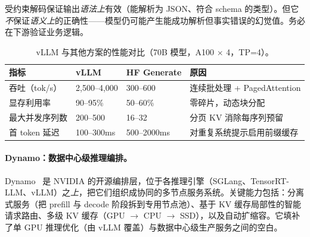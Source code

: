 \begin{warningbox}[结构化输出 $\neq$ 正确输出]
受约束解码保证输出\emph{语法上}有效（能解析为 JSON、符合 schema 的类型）。但它\emph{不}保证\emph{语义上}的正确性——模型仍可能产生能成功解析但事实错误的幻觉值。务必在下游验证业务逻辑。
\end{warningbox}

\begin{table}[ht!]
\centering\small
\caption{vLLM 与其他方案的性能对比（70B 模型，A100 $\times$ 4，TP=4）。}
\noindent\begin{tabularx}{\linewidth}{@{}l Z{0.61} Z{0.6} Z{1.79}@{}}
\toprule
\textbf{指标} & \textbf{vLLM} & \textbf{HF Generate} & \textbf{原因} \\
\midrule
吞吐（tok/s） & 2,500--4,000 & 300--600 & 连续批处理 + PagedAttention \\
显存利用率 & 90--95\% & 50--60\% & 零碎片，动态块分配 \\
最大并发序列数 & 200--500 & 16--32 & 分页 KV 消除每序列预留 \\
首 token 延迟 & 100--300ms & 500--2000ms & 对重复系统提示启用前缀缓存 \\
\bottomrule
\end{tabularx}
\end{table}

\paragraph{Dynamo：数据中心级推理编排。}
Dynamo~\cite{dynamo2025nvidia} 是 NVIDIA 的开源编排层，位于各推理引擎（SGLang、TensorRT-LLM、vLLM）之\emph{上}，把它们组织成协同的多节点服务系统。关键能力包括：分离式服务（把 prefill 与 decode 阶段拆到专用节点池）、基于 KV 缓存局部性的智能请求路由、多级 KV 缓存（GPU $\to$ CPU $\to$ SSD），以及自动扩缩容。它填补了单 GPU 推理优化（由 vLLM 覆盖）与数据中心级生产服务之间的空白。

